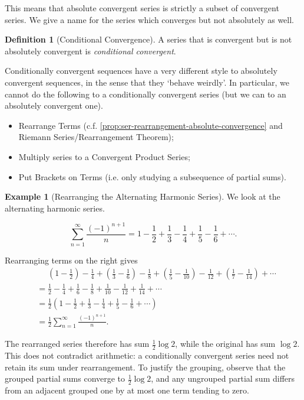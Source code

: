 \documentclass[11pt]{article}
\numberwithin{equation}{section}
\theoremstyle{definition}
\newtheorem{definition}[theorem]{Definition}
\newtheorem{example}[theorem]{Example}
\theoremstyle{remark}
\newcommand{\pqty}[1]{\left(#1\right)}
\begin{document}
This means that absolute convergent series is strictly a subset of convergent series. We give a name for the series which converges but not absolutely as well.

\begin{definition}[Conditional Convergence]\label{analysis-unit-0058}
    \label{def:ser-conditional-convergence}%
    A series that is convergent but is not absolutely convergent is \emph{conditional convergent}.
\end{definition}

Conditionally convergent sequences have a very different style to absolutely convergent sequences, in the sense that they `behave weirdly'. In particular, we cannot do the following to a conditionally convergent series (but we can to an absolutely convergent one).

\begin{itemize}
    \item Rearrange Terms (c.f. \autoref{prop:ser-rearrangement-absolute-convergence} and Riemann Series/Rearrangement Theorem);
    \item Multiply series to a Convergent Product Series;
    \item Put Brackets on Terms (i.e. only studying a subsequence of partial sums).
\end{itemize}

\begin{example}[Rearranging the Alternating Harmonic Series]\label{analysis-unit-0059}
    \label{ex:ser-rearrange-alternating-harmonic}%
    We look at the alternating harmonic series.

    \[
        \sum_{n = 1}^{\infty} \frac{\pqty{-1}^{n + 1}}{n} = 1 - \frac{1}{2} + \frac{1}{3} - \frac{1}{4} + \frac{1}{5} - \frac{1}{6} + \cdots.
    \]

    Rearranging terms on the right gives
    \begin{align*}
        &\phantom{=} \pqty{1 - \frac{1}{2}} - \frac{1}{4} + \pqty{\frac{1}{3} - \frac{1}{6}} - \frac{1}{8} + \pqty{\frac{1}{5} - \frac{1}{10}} - \frac{1}{12} + \pqty{\frac{1}{7} - \frac{1}{14}} + \cdots \\
        &= \frac{1}{2} - \frac{1}{4} + \frac{1}{6} - \frac{1}{8} + \frac{1}{10} - \frac{1}{12} + \frac{1}{14} + \cdots \\
        &= \frac{1}{2} \pqty{1 - \frac{1}{2} + \frac{1}{3} - \frac{1}{4} + \frac{1}{5} - \frac{1}{6} + \cdots} \\
        &= \frac{1}{2} \sum_{n = 1}^{\infty} \frac{\pqty{-1}^{n + 1}}{n}.
    \end{align*}

    The rearranged series therefore has sum \(\tfrac12\log2\), while the original
has sum \(\log2\). This does not contradict arithmetic: a conditionally convergent
series need not retain its sum under rearrangement. To justify the grouping,
observe that the grouped partial sums converge to \(\tfrac12\log2\), and any
ungrouped partial sum differs from an adjacent grouped one by at most one
term tending to zero.
\end{example}
\end{document}
